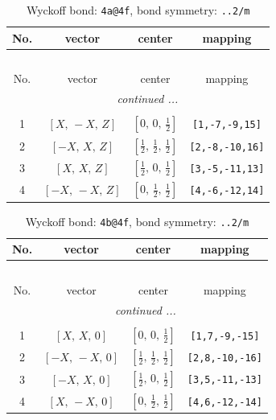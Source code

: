 \documentclass[fleqn,8pt]{jsarticle}
\begin{document}
\begin{longtable}{cccc}
\caption{Wyckoff bond: {\tt 4a@4f}, bond symmetry: {\tt ..2/m}}
 \\
 \hline \hline
No. & vector & center & mapping \\ \hline \endfirsthead

\multicolumn{3}{l}{\tablename\ \thetable{}} \\
 \hline \hline
No. & vector & center & mapping \\ \hline \endhead

 \hline \hline
\multicolumn{3}{r}{\footnotesize\it continued ...} \\ \endfoot

 \hline \hline
\multicolumn{3}{r}{} \\ \endlastfoot

1 & $\left[ X,\, - X,\, Z \right]$ & $\left[ 0,\, 0,\, \frac{1}{2} \right]$ & {\tt [1,-7,-9,15]} \\ \hline
2 & $\left[ - X,\, X,\, Z \right]$ & $\left[ \frac{1}{2},\, \frac{1}{2},\, \frac{1}{2} \right]$ & {\tt [2,-8,-10,16]} \\ \hline
3 & $\left[ X,\, X,\, Z \right]$ & $\left[ \frac{1}{2},\, 0,\, \frac{1}{2} \right]$ & {\tt [3,-5,-11,13]} \\ \hline
4 & $\left[ - X,\, - X,\, Z \right]$ & $\left[ 0,\, \frac{1}{2},\, \frac{1}{2} \right]$ & {\tt [4,-6,-12,14]} \\
\end{longtable}
\renewcommand{\arraystretch}{1.2}
\begin{longtable}{cccc}
\caption{Wyckoff bond: {\tt 4b@4f}, bond symmetry: {\tt ..2/m}}
 \\
 \hline \hline
No. & vector & center & mapping \\ \hline \endfirsthead

\multicolumn{3}{l}{\tablename\ \thetable{}} \\
 \hline \hline
No. & vector & center & mapping \\ \hline \endhead

 \hline \hline
\multicolumn{3}{r}{\footnotesize\it continued ...} \\ \endfoot

 \hline \hline
\multicolumn{3}{r}{} \\ \endlastfoot

1 & $\left[ X,\, X,\, 0 \right]$ & $\left[ 0,\, 0,\, \frac{1}{2} \right]$ & {\tt [1,7,-9,-15]} \\ \hline
2 & $\left[ - X,\, - X,\, 0 \right]$ & $\left[ \frac{1}{2},\, \frac{1}{2},\, \frac{1}{2} \right]$ & {\tt [2,8,-10,-16]} \\ \hline
3 & $\left[ - X,\, X,\, 0 \right]$ & $\left[ \frac{1}{2},\, 0,\, \frac{1}{2} \right]$ & {\tt [3,5,-11,-13]} \\ \hline
4 & $\left[ X,\, - X,\, 0 \right]$ & $\left[ 0,\, \frac{1}{2},\, \frac{1}{2} \right]$ & {\tt [4,6,-12,-14]} \\
\end{longtable}
\end{document}
